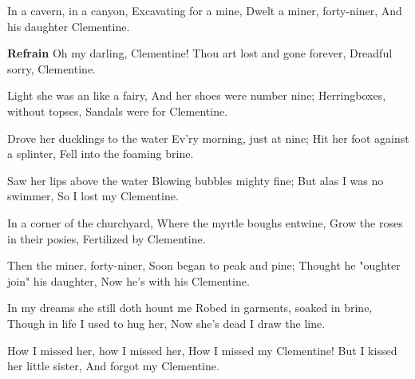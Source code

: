 \footnotemark [
ititle={Clementine}]


\beginverse
In a cavern, in a canyon,
Excavating for a mine,
Dwelt a miner, forty-niner,
And his daughter Clementine.
\endverse

\beginchorus
\textbf{Refrain}
Oh my darling, Clementine!
Thou art lost and gone forever,
Dreadful sorry, Clementine.
\endchorus

\beginverse
Light she was an like a fairy,
And her shoes were number nine;
Herringboxes, without topses,
Sandals were for Clementine.
\endverse

\beginverse
Drove her ducklings to the water
Ev'ry morning, just at nine;
Hit her foot against a splinter,
Fell into the foaming brine.
\endverse

\beginverse
Saw her lips above the water
Blowing bubbles mighty fine;
But alas I was no swimmer,
So I lost my Clementine.
\endverse

\beginverse
In a corner of the churchyard,
Where the myrtle boughs entwine,
Grow the roses in their posies,
Fertilized by Clementine.
\endverse

\beginverse
Then the miner, forty-niner,
Soon began to peak and pine;
Thought he "oughter join" his daughter,
Now he's with his Clementine.
\endverse

\beginverse
In my dreams she still doth hount me
Robed in garments, soaked in brine,
Though in life I used to hug her,
Now she's dead I draw the line.
\endverse

\beginverse
How I missed her, how I missed her,
How I missed my Clementine!
But I kissed her little sister,
And forgot my Clementine.
\endverse
\endsong
